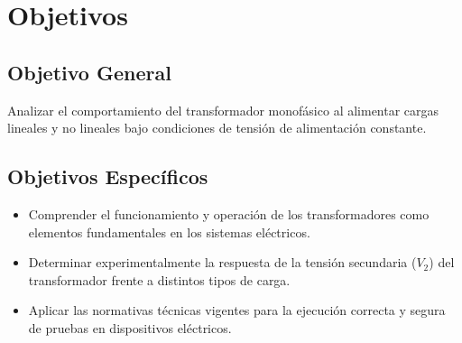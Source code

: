 \section{Objetivos}
\subsection*{Objetivo General}
Analizar el comportamiento del transformador monofásico al alimentar cargas lineales y no lineales bajo condiciones de tensión de alimentación constante.

\subsection*{Objetivos Específicos}
\begin{itemize}
    \item Comprender el funcionamiento y operación de los transformadores como elementos fundamentales en los sistemas eléctricos.
    \item Determinar experimentalmente la respuesta de la tensión secundaria ($V_2$) del transformador frente a distintos tipos de carga.
    \item Aplicar las normativas técnicas vigentes para la ejecución correcta y segura de pruebas en dispositivos eléctricos.
\end{itemize}